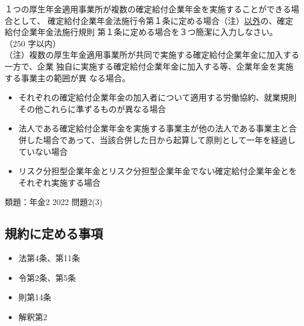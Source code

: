 \begin{shortanswer}[年金1 \ 2023 \ 問題2(1)ア]
１つの厚生年金適用事業所が複数の確定給付企業年金を実施することができる場合として、
確定給付企業年金法施行令第１条に定める場合（注）\underline{以外}の、確定給付企業年金法施行規則
第１条に定める場合を３つ簡潔に入力しなさい。 （250 字以内）\\
（注）複数の厚生年金適用事業所が共同で実施する確定給付企業年金に加入する一方で、企業
独自に実施する確定給付企業年金に加入する等、企業年金を実施する事業主の範囲が異
なる場合。
\end{shortanswer}

\begin{answerbox}
 \begin{itemize}
  \item それぞれの確定給付企業年金の加入者について適用する労働協約、就業規則その他これらに準ずるものが異なる場合
  \item 法人である確定給付企業年金を実施する事業主が他の法人である事業主と合併した場合であって、当該合併した日から起算して原則として一年を経過していない場合
  \item リスク分担型企業年金とリスク分担型企業年金でない確定給付企業年金とをそれぞれ実施する場合
 \end{itemize}
\end{answerbox}

\begin{explanationbox}
  類題：年金2 2022 問題2(3)
\end{explanationbox}

\newpage

\subsection{規約に定める事項}



\begin{InyouJobunbox}
  \begin{itemize}
    \item 法第4条、第11条
    \item 令第2条、第5条
    \item 則第14条
    \item 解釈第2
  \end{itemize}
\end{InyouJobunbox}


